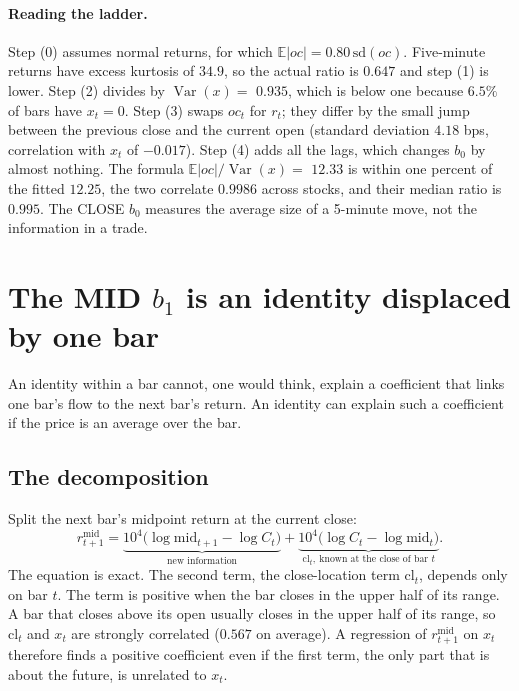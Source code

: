 \documentclass[11pt,a4paper]{article}
\newcommand{\E}{\mathbb{E}}
\begin{document}
\paragraph{Reading the ladder.} Step (0) assumes normal returns, for which $\E|oc|=0.80\,\mathrm{sd}(oc)$.
Five-minute returns have excess kurtosis of $34.9$, so the actual ratio is $0.647$ and step (1)
is lower. Step (2) divides by $\operatorname{Var}(x)=$ $0.935$, which is below one because $6.5\%$ of bars
have $x_t=0$. Step (3) swaps $oc_t$ for $r_t$; they differ by the small jump between the previous close
and the current open (standard deviation $4.18$ bps, correlation with $x_t$ of $-0.017$).
Step (4) adds all the lags, which changes $b_0$ by almost nothing. The formula
$\E|oc|/\operatorname{Var}(x)=$ $12.33$ is within one percent of the fitted $12.25$, the two
correlate $0.9986$ across stocks, and their median ratio is $0.995$. The CLOSE $b_0$ measures the
average size of a 5-minute move, not the information in a trade.

\section{The MID $b_1$ is an identity displaced by one bar}
\label{sec:b1}

An identity within a bar cannot, one would think, explain a coefficient that links one bar's flow to
the next bar's return. An identity can explain such a coefficient if the price is an average over the bar.

\subsection{The decomposition}

Split the next bar's midpoint return at the current close:
\begin{equation}
r^{\mathrm{mid}}_{t+1} = \underbrace{10^4\big(\log \mathrm{mid}_{t+1}-\log C_t\big)}_{\text{new information}}
+ \underbrace{10^4\big(\log C_t-\log \mathrm{mid}_t\big)}_{\mathrm{cl}_t,\ \text{known at the close of bar } t}.
\label{eq:decomp}
\end{equation}
The equation is exact. The second term, the close-location term $\mathrm{cl}_t$, depends only on bar $t$. The term is positive when the bar closes in the upper half of its range. A bar that closes above its open
usually closes in the upper half of its range, so $\mathrm{cl}_t$ and $x_t$ are strongly correlated
($0.567$ on average). A regression of $r^{\mathrm{mid}}_{t+1}$ on $x_t$ therefore finds a positive
coefficient even if the first term, the only part that is about the future, is unrelated to $x_t$.
\end{document}

